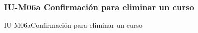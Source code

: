 
\subsubsection{IU-M06a Confirmación para eliminar un curso}


        {IU-M06a}{Confirmación para eliminar un curso}

\begin{comment}
\subsubsection{Elementos Relevantes}

    \begin{itemize}
    \item {\bf Lorem ipsum}
        ...
    \end{itemize}

\subsubsection{Acciones relevantes}

    \begin{itemize}
    \item {\bf Lorem ipsum}
        ...
    \end{itemize}
\end{comment}

\clearpage
